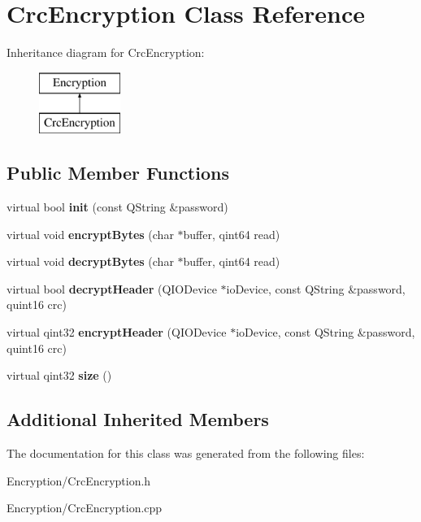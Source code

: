 \hypertarget{class_crc_encryption}{}\section{Crc\+Encryption Class Reference}
\label{class_crc_encryption}
Inheritance diagram for Crc\+Encryption\+:\begin{figure}[H]
\begin{center}
\leavevmode
\includegraphics[height=2.000000cm]{class_crc_encryption}
\end{center}
\end{figure}
\subsection*{Public Member Functions}
\begin{DoxyCompactItemize}
\item 
virtual bool {\bfseries init} (const Q\+String \&password)\hypertarget{class_crc_encryption_a96a5a38de291acf747e3877e8152cf2f}{}\label{class_crc_encryption_a96a5a38de291acf747e3877e8152cf2f}

\item 
virtual void {\bfseries encrypt\+Bytes} (char $\ast$buffer, qint64 read)\hypertarget{class_crc_encryption_a15c9ea560fa38faad31753f8d1b4cde2}{}\label{class_crc_encryption_a15c9ea560fa38faad31753f8d1b4cde2}

\item 
virtual void {\bfseries decrypt\+Bytes} (char $\ast$buffer, qint64 read)\hypertarget{class_crc_encryption_a493ac6c8358a4d16bef448868f38c70c}{}\label{class_crc_encryption_a493ac6c8358a4d16bef448868f38c70c}

\item 
virtual bool {\bfseries decrypt\+Header} (Q\+I\+O\+Device $\ast$io\+Device, const Q\+String \&password, quint16 crc)\hypertarget{class_crc_encryption_a9a02a41d83dfba15804a354fb819c78a}{}\label{class_crc_encryption_a9a02a41d83dfba15804a354fb819c78a}

\item 
virtual qint32 {\bfseries encrypt\+Header} (Q\+I\+O\+Device $\ast$io\+Device, const Q\+String \&password, quint16 crc)\hypertarget{class_crc_encryption_abe8a41f417076ad49206d6322da21fcb}{}\label{class_crc_encryption_abe8a41f417076ad49206d6322da21fcb}

\item 
virtual qint32 {\bfseries size} ()\hypertarget{class_crc_encryption_ad9a3ee53ea1b8074045d76b27cddeecc}{}\label{class_crc_encryption_ad9a3ee53ea1b8074045d76b27cddeecc}

\end{DoxyCompactItemize}
\subsection*{Additional Inherited Members}


The documentation for this class was generated from the following files\+:\begin{DoxyCompactItemize}
\item 
Encryption/Crc\+Encryption.\+h\item 
Encryption/Crc\+Encryption.\+cpp\end{DoxyCompactItemize}
